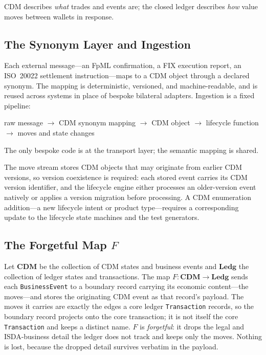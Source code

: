CDM describes \textit{what} trades and events are; the closed ledger describes \textit{how} value moves between wallets in response.

\subsection{The Synonym Layer and Ingestion}

Each external message---an FpML confirmation, a FIX execution report, an ISO~20022 settlement instruction---maps to a CDM object through a declared synonym. The mapping is deterministic, versioned, and machine-readable, and is reused across systems in place of bespoke bilateral adapters. Ingestion is a fixed pipeline:

\begin{center}
raw message $\to$ CDM synonym mapping $\to$ CDM object $\to$ lifecycle function $\to$ moves and state changes
\end{center}

The only bespoke code is at the transport layer; the semantic mapping is shared.

The move stream stores CDM objects that may originate from earlier CDM versions, so version coexistence is required: each stored event carries its CDM version identifier, and the lifecycle engine either processes an older-version event natively or applies a version migration before processing. A CDM enumeration addition---a new lifecycle intent or product type---requires a corresponding update to the lifecycle state machines and the test generators.

\subsection{The Forgetful Map \texorpdfstring{$F$}{F}}

Let $\mathbf{CDM}$ be the collection of CDM states and business events and $\mathbf{Ledg}$ the collection of ledger states and transactions. The map $F : \mathbf{CDM} \to \mathbf{Ledg}$ sends each \texttt{BusinessEvent} to a boundary record carrying its economic content---the moves---and stores the originating CDM event as that record's payload. The moves it carries are exactly the edges a core ledger \texttt{Transaction} records, so the boundary record projects onto the core transaction; it is not itself the core \texttt{Transaction} and keeps a distinct name. $F$ is \textit{forgetful}: it drops the legal and ISDA-business detail the ledger does not track and keeps only the moves. Nothing is lost, because the dropped detail survives verbatim in the payload.

